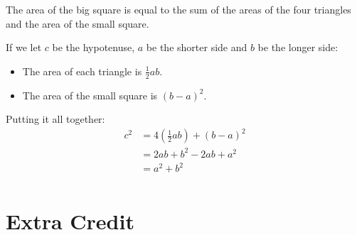 \documentclass[fleqn,addpoints]{exam}
\begin{document}
\begin{questions}
\begin{solution}
The area of the big square is equal to the sum of the areas of the four triangles and the area of the small square.

If we let $c$ be the hypotenuse, $a$ be the shorter side and $b$ be the longer side:

\begin{itemize}
  \item The area of each triangle is \(\frac{1}{2} ab \). 
  \item The area of the small square is \( (b - a)^2 \). 
\end{itemize}

Putting it all together:
\begin{align*}
  c^2 &= 4(\frac{1}{2}ab) + (b - a)^2 \\
      &= 2ab + b^2 - 2ab + a^2 \\
      &= a^2 + b^2 \\
\end{align*}

\end{solution}

\end{questions}

\pagebreak

\section{Extra Credit}
\end{document}
